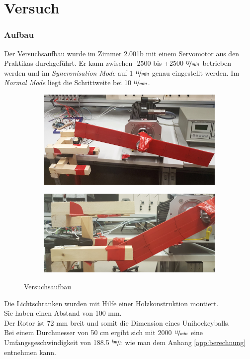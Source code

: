 \part{Versuch}
\section{Aufbau}
Der Versuchsaufbau wurde im Zimmer 2.001b mit einem Servomotor aus den Praktikas durchgeführt. Er kann zwischen -2500 bis +2500 $\nicefrac{U}{min}$ betrieben werden und im \textit{Syncronisation Mode} auf 1 $\nicefrac{U}{min}$ genau eingestellt werden. Im \textit{Normal Mode} liegt die Schrittweite bei 10 $\nicefrac{U}{min}$.

\begin{figure}[ht]
    \centering
    \begin{subfigure}[c]{0.8\textwidth}       
        \includegraphics[width=\textwidth]{images/Aufbau.jpg}
    \end{subfigure}

    \begin{subfigure}[c]{0.8\textwidth}
        \includegraphics[width=\textwidth]{images/AufbauDetail.jpg}
    \end{subfigure}
    \caption{Versuchsaufbau}\label{fig:Aufbau}   
\end{figure}

Die Lichtschranken wurden mit Hilfe einer Holzkonstruktion montiert.\\
Sie haben einen Abstand von 100 mm.\\
Der  Rotor ist 72 mm breit und somit die Dimension eines Unihockeyballs.\\

Bei einem Durchmesser von 50 cm ergibt sich mit 2000 $\nicefrac{U}{min}$ eine Umfangsgeschwindigkeit von 188.5 $\nicefrac{km}{h}$ wie man dem Anhang \ref{app:berechnung} entnehmen kann.